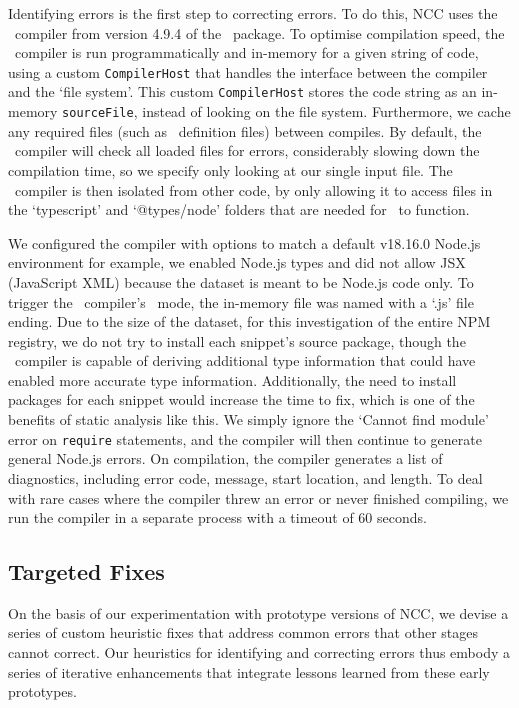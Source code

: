 \documentclass[conference]{IEEEtran}
\begin{document}
Identifying errors is the first step to correcting errors. To do this, NCC uses the \ts\ compiler from version 4.9.4
of the \ts\ package. To optimise compilation speed, the \ts\ compiler is run programmatically and in-memory for a given string of code, using a custom \texttt{CompilerHost} that handles the interface between the compiler and the `file system'. This custom \texttt{CompilerHost} stores the code string as an in-memory \texttt{sourceFile}, instead of looking on the file system. Furthermore, we cache any required files (such as \ts\ definition files) between compiles. By default, the \ts\ compiler will check all loaded files for errors, considerably slowing down the compilation time, so we specify only looking at our single input file. The \ts\ compiler is then isolated from other code, by only allowing it to access files in the `typescript' and `@types/node' folders that are needed for \ts\ to function.

We configured the compiler with options to match a default v18.16.0 Node.js environment for example, we enabled Node.js types and did not allow JSX (JavaScript XML) because the dataset is meant to be Node.js code only. To trigger the \ts\ compiler's \js\ mode, the in-memory file was named with a `.js' file ending. Due to the size of the dataset, for this investigation of the entire NPM registry, we do not try to install each snippet's source package, though the \ts\ compiler is capable of deriving additional type information that could have enabled more accurate type information. Additionally, the need to install packages for each snippet would increase the time to fix, which is one of the benefits of static analysis like this. We simply ignore the `Cannot find module' error on \texttt{require} statements, and the compiler will then continue to generate general Node.js errors. On compilation, the compiler generates a list of diagnostics, including error code, message, start location, and length. To deal with rare cases where the compiler threw an error or never finished compiling, we run the compiler in a separate process with a timeout of 60 seconds.

\subsection{Targeted Fixes}

On the basis of our experimentation with prototype versions of NCC, we devise a series of custom heuristic fixes that address common errors that other stages cannot correct. Our heuristics for identifying and correcting errors thus embody a series of iterative enhancements that integrate lessons learned from these early prototypes. 
\end{document}
